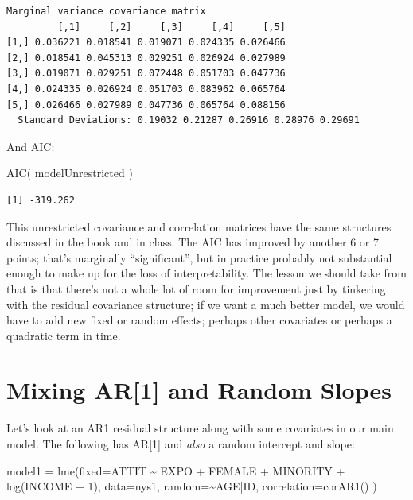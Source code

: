 \documentclass[
  letterpaper,
  DIV=11,
  numbers=noendperiod]{scrreprt}
\newenvironment{Shaded}{\begin{snugshade}}{\end{snugshade}}
\newcommand{\AttributeTok}[1]{\textcolor[rgb]{0.49,0.56,0.16}{#1}}
\newcommand{\DecValTok}[1]{\textcolor[rgb]{0.25,0.63,0.44}{#1}}
\newcommand{\FunctionTok}[1]{\textcolor[rgb]{0.02,0.16,0.49}{#1}}
\newcommand{\NormalTok}[1]{\textcolor[rgb]{0.00,0.44,0.13}{#1}}
\newcommand{\OtherTok}[1]{\textcolor[rgb]{0.00,0.44,0.13}{#1}}
\newcommand{\SpecialCharTok}[1]{\textcolor[rgb]{0.25,0.44,0.63}{#1}}
\begin{document}
\begin{verbatim}
Marginal variance covariance matrix
         [,1]     [,2]     [,3]     [,4]     [,5]
[1,] 0.036221 0.018541 0.019071 0.024335 0.026466
[2,] 0.018541 0.045313 0.029251 0.026924 0.027989
[3,] 0.019071 0.029251 0.072448 0.051703 0.047736
[4,] 0.024335 0.026924 0.051703 0.083962 0.065764
[5,] 0.026466 0.027989 0.047736 0.065764 0.088156
  Standard Deviations: 0.19032 0.21287 0.26916 0.28976 0.29691 
\end{verbatim}

And AIC:

\begin{Shaded}
\begin{Highlighting}[]
\FunctionTok{AIC}\NormalTok{( modelUnrestricted )}
\end{Highlighting}
\end{Shaded}

\begin{verbatim}
[1] -319.262
\end{verbatim}

This unrestricted covariance and correlation matrices have the same
structures discussed in the book and in class. The AIC has improved by
another 6 or 7 points; that's marginally ``significant'', but in
practice probably not substantial enough to make up for the loss of
interpretability. The lesson we should take from that is that there's
not a whole lot of room for improvement just by tinkering with the
residual covariance structure; if we want a much better model, we would
have to add new fixed or random effects; perhaps other covariates or
perhaps a quadratic term in time.

\hypertarget{mixing-ar1-and-random-slopes}{%
\section{Mixing AR{[}1{]} and Random
Slopes}\label{mixing-ar1-and-random-slopes}}

Let's look at an AR1 residual structure along with some covariates in
our main model. The following has AR{[}1{]} and \emph{also} a random
intercept and slope:

\begin{Shaded}
\begin{Highlighting}[]
\NormalTok{model1 }\OtherTok{=} \FunctionTok{lme}\NormalTok{(}\AttributeTok{fixed=}\NormalTok{ATTIT }\SpecialCharTok{\textasciitilde{}}\NormalTok{ EXPO }\SpecialCharTok{+}\NormalTok{ FEMALE }\SpecialCharTok{+}\NormalTok{ MINORITY }\SpecialCharTok{+} \FunctionTok{log}\NormalTok{(INCOME }\SpecialCharTok{+} \DecValTok{1}\NormalTok{), }
              \AttributeTok{data=}\NormalTok{nys1,}
              \AttributeTok{random=}\SpecialCharTok{\textasciitilde{}}\NormalTok{AGE}\SpecialCharTok{|}\NormalTok{ID,}
              \AttributeTok{correlation=}\FunctionTok{corAR1}\NormalTok{()  )}
\end{Highlighting}
\end{Shaded}
\end{document}
